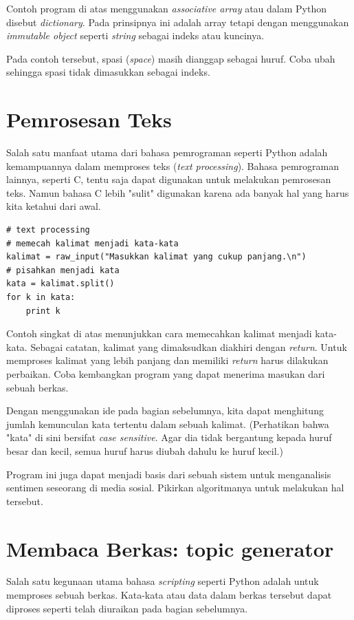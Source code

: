 Contoh program di atas menggunakan {\em associative array} atau dalam
Python disebut {\em dictionary}. Pada prinsipnya ini adalah array tetapi
dengan menggunakan {\em immutable object} seperti {\em string} sebagai
indeks atau kuncinya.

Pada contoh tersebut, spasi ({\em space}) masih dianggap sebagai huruf.
Coba ubah sehingga spasi tidak dimasukkan sebagai indeks.


\section{Pemrosesan Teks}
Salah satu manfaat utama dari bahasa pemrograman seperti Python adalah
kemampuannya dalam memproses teks ({\em text processing}). Bahasa
pemrograman lainnya, seperti C, tentu saja dapat digunakan untuk melakukan
pemrosesan teks. Namun bahasa C lebih "sulit" digunakan karena ada banyak
hal yang harus kita ketahui dari awal.

\begin{verbatim}
# text processing
# memecah kalimat menjadi kata-kata
kalimat = raw_input("Masukkan kalimat yang cukup panjang.\n")
# pisahkan menjadi kata
kata = kalimat.split()
for k in kata:
    print k
\end{verbatim}

Contoh singkat di atas menunjukkan cara memecahkan kalimat menjadi kata-kata.
Sebagai catatan, kalimat yang dimaksudkan diakhiri dengan {\em return}. 
Untuk memproses kalimat yang lebih panjang dan memiliki {\em return} harus 
dilakukan perbaikan.
Coba kembangkan program yang dapat menerima masukan dari sebuah berkas.

Dengan menggunakan ide pada bagian sebelumnya, kita dapat menghitung
jumlah kemunculan kata tertentu dalam sebuah kalimat. (Perhatikan bahwa
"kata" di sini bersifat {\em case sensitive}. Agar dia tidak bergantung
kepada huruf besar dan kecil, semua huruf harus diubah dahulu ke
huruf kecil.)

Program ini juga dapat menjadi basis dari sebuah sistem untuk menganalisis
sentimen seseorang di media sosial. Pikirkan algoritmanya untuk melakukan
hal tersebut.


\section{Membaca Berkas: topic generator}
Salah satu kegunaan utama bahasa {\em scripting} seperti Python adalah
untuk memproses sebuah berkas. Kata-kata atau data dalam berkas tersebut
dapat diproses seperti telah diuraikan pada bagian sebelumnya.

